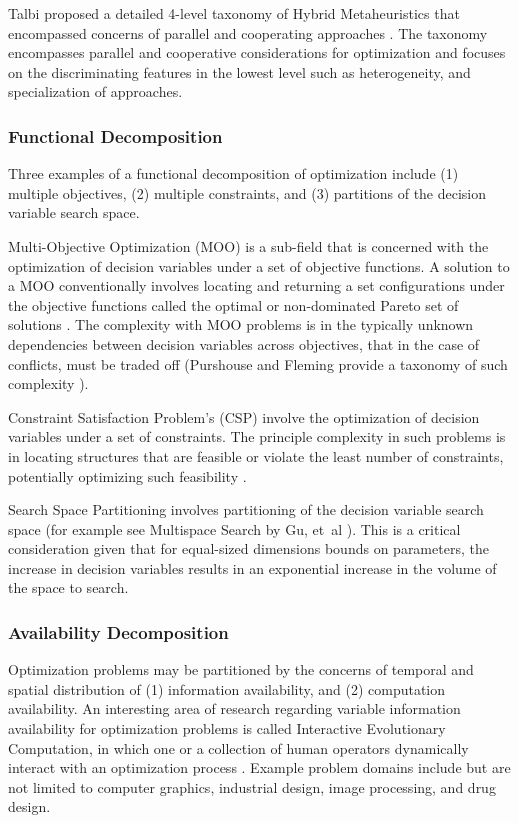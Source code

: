 \documentclass[a4paper, 11pt]{article}
\begin{document}
Talbi proposed a detailed 4-level taxonomy of Hybrid Metaheuristics that encompassed concerns of parallel and cooperating approaches \cite{Talbi2001}. The taxonomy encompasses parallel and cooperative considerations for optimization and focuses on the discriminating features in the lowest level such as heterogeneity, and specialization of approaches.
	
\subsubsection{Functional Decomposition}
Three examples of a functional decomposition of optimization include (1) multiple objectives, (2) multiple constraints, and (3) partitions of the decision variable search space. 

Multi-Objective Optimization (MOO) is a sub-field that is concerned with the optimization of decision variables under a set of objective functions. A solution to a MOO conventionally involves locating and returning a set configurations under the objective functions called the optimal or non-dominated Pareto set of solutions \cite{Deb2001}. The complexity with MOO problems is in the typically unknown dependencies between decision variables across objectives, that in the case of conflicts, must be traded off (Purshouse and Fleming provide a taxonomy of such complexity \cite{Purshouse2003}). 

Constraint Satisfaction Problem's (CSP) involve the optimization of decision variables under a set of constraints. The principle complexity in such problems is in locating structures that are feasible or violate the least number of constraints, potentially optimizing such feasibility \cite{Tsang1993, Kumar1992}. 

Search Space Partitioning involves partitioning of the decision variable search space (for example see Multispace Search by Gu, et~al \cite{Du1997, Gu1997, Gu1994}). This is a critical consideration given that for equal-sized dimensions bounds on parameters, the increase in decision variables results in an exponential increase in the volume of the space to search.
			
\subsubsection{Availability Decomposition}
Optimization problems may be partitioned by the concerns of temporal and spatial distribution of (1) information availability, and (2) computation availability. An interesting area of research regarding variable information availability for optimization problems is called Interactive Evolutionary Computation, in which one or a collection of human operators dynamically interact with an optimization process \cite{Takagi2001}. Example problem domains include but are not limited to computer graphics, industrial design, image processing, and drug design. 
\end{document}
